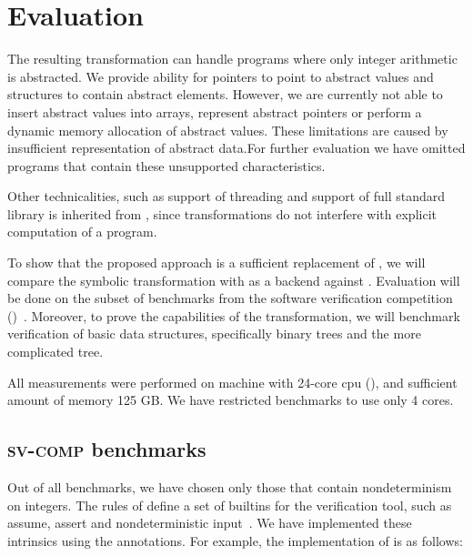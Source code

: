 \chapter{Evaluation}\label{ch:results}

The resulting transformation can handle programs where only integer
arithmetic is abstracted. We provide ability for pointers to point to
abstract values and structures to contain abstract elements. However, we are
currently not able to insert abstract values into arrays, represent abstract
pointers or perform a dynamic memory allocation of abstract values. These
limitations are caused by insufficient representation of abstract
data.For further evaluation we have omitted programs that contain
these unsupported characteristics.

Other technicalities, such as support of threading and support of full \Cpp{}
standard library is inherited from \DIVINE, since transformations do not
interfere with explicit computation of a program.

To show that the proposed approach is a sufficient replacement of \SymDIVINE, we
will compare the symbolic transformation with \DIVINE as a backend against
\SymDIVINE. Evaluation will be done on the subset of benchmarks from the software
verification competition (\svcomp)~\cite{Beyer17}.
Moreover, to prove the capabilities of the transformation, we will benchmark
verification of basic data structures, specifically binary trees and the more
complicated \AVL tree.

All measurements were performed on machine with 24-core cpu (), and sufficient amount of memory 125 GB. We have restricted benchmarks to use
only 4 cores.

\section{\textsc{sv-comp} benchmarks}

Out of all \svcomp benchmarks, we have chosen only those that contain
nondeterminism on integers. The rules of \svcomp define a set of builtins for the
verification tool, such as assume, assert and nondeterministic
input~\cite{svcomp}. We have implemen\-ted these intrinsics using the annotations.
For example, the implementation of  is as
follows:

